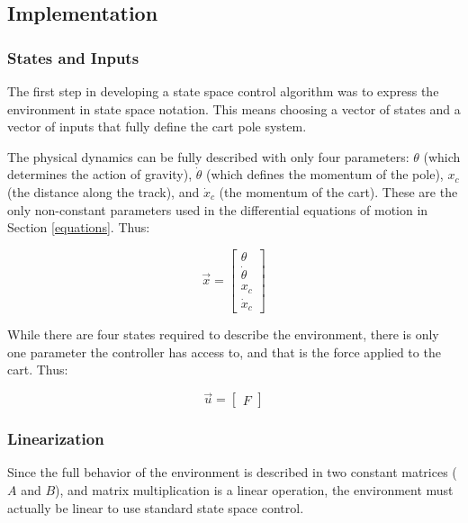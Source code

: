 \documentclass[12pt]{article}
\begin{document}
\subsection{Implementation}

\subsubsection{States and Inputs}

The first step in developing a state space control algorithm was to express the environment in state space notation. This means choosing a vector of states and a vector of inputs that fully define the cart pole system.

The physical dynamics can be fully described with only four parameters: $\theta$ (which determines the action of gravity), $\dot \theta$ (which defines the momentum of the pole), $x _c$ (the distance along the track), and $\dot x _c$ (the momentum of the cart). These are the only non-constant parameters used in the differential equations of motion in Section \ref{equations}. Thus:

\begin{equation}
    \displaystyle \vec{x} = \begin{bmatrix}
        \theta \\
        \dot \theta \\
        x _c \\
        \dot x _c
    \end{bmatrix}
\end{equation}

While there are four states required to describe the environment, there is only one parameter the controller has access to, and that is the force applied to the cart. Thus:

\begin{equation}
    \vec{u} = \begin{bmatrix}
        \displaystyle F
    \end{bmatrix}
\end{equation}

\subsubsection{Linearization}

Since the full behavior of the environment is described in two constant matrices ($A$ and $B$), and matrix multiplication is a linear operation, the environment must actually be linear to use standard state space control.
\end{document}
